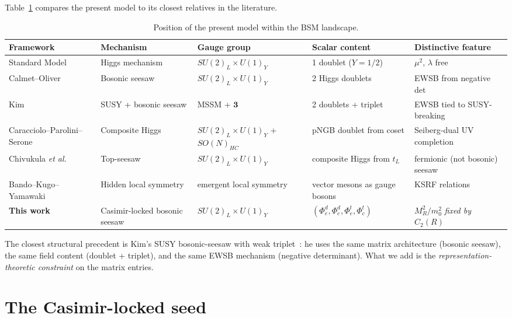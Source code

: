 \documentclass[11pt,a4paper]{article}
\newcommand{\mt}{\mathbf{3}}
\newcommand{\Cas}{C_2}
\begin{document}
Table~\ref{tab:landscape} compares the present model to its closest
relatives in the literature.

\begin{table}[ht]
\centering
\small
\begin{tabular}{p{3.6cm} p{2.6cm} p{2.6cm} p{3.0cm} p{3.0cm}}
\toprule
\textbf{Framework} & \textbf{Mechanism} & \textbf{Gauge group} &
\textbf{Scalar content} & \textbf{Distinctive feature} \\
\midrule
Standard Model & Higgs mechanism & $SU(2)_L \times U(1)_Y$ &
1 doublet ($Y=1/2$) & $\mu^2$, $\lambda$ free \\
Calmet--Oliver~\cite{Calmet2006} & Bosonic seesaw & $SU(2)_L \times U(1)_Y$ &
2 Higgs doublets & EWSB from negative det \\
Kim~\cite{Kim2005} & SUSY + bosonic seesaw & MSSM + $\mt$ &
2 doublets + triplet & EWSB tied to SUSY-breaking \\
Caracciolo--Parolini--Serone~\cite{Caracciolo2012} & Composite Higgs &
$SU(2)_L \times U(1)_Y$ + $SO(N)_{HC}$ & pNGB doublet from coset &
Seiberg-dual UV completion \\
Chivukula \emph{et al.}~\cite{Chivukula1998} & Top-seesaw &
$SU(2)_L \times U(1)_Y$ & composite Higgs from $t_L$ &
fermionic (not bosonic) seesaw \\
Bando--Kugo--Yamawaki~\cite{Bando1985} & Hidden local symmetry &
emergent local symmetry & vector mesons as gauge bosons & KSRF relations \\
\midrule
\textbf{This work} & Casimir-locked bosonic seesaw &
$SU(2)_L \times U(1)_Y$ & $(\Phi^d_e, \Phi^d_c, \Phi^t_e, \Phi^t_c)$ &
$M^2_R / m_0^2$ \emph{fixed by} $\Cas(R)$ \\
\bottomrule
\end{tabular}
\caption{Position of the present model within the BSM landscape.}
\label{tab:landscape}
\end{table}

The closest structural precedent is Kim's SUSY bosonic-seesaw with weak
triplet~\cite{Kim2005}: he uses the same matrix architecture (bosonic
seesaw), the same field content (doublet + triplet), and the same EWSB
mechanism (negative determinant). What we add is the
\emph{representation-theoretic constraint} on the matrix entries.

\section{The Casimir-locked seed}
\end{document}
